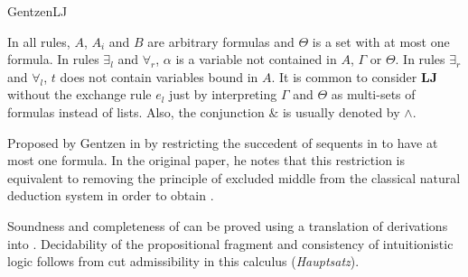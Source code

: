 \begin{entry}{GentzenLJ}
\begin{clarifications}
In all rules, $A$, $A_i$ and $B$ are arbitrary formulas and $\Theta$ is a set
with at most one formula. In rules $\exists_l$
and $\forall_r$, $\alpha$ is a variable not contained in $A$, $\Gamma$ or
$\Theta$. In rules $\exists_r$ and $\forall_l$, $t$ does not contain variables
bound in $A$.
It is common to consider \textbf{LJ} without the exchange rule $e_l$ just by
interpreting $\Gamma$ and $\Theta$ as multi-sets of formulas instead of lists.
Also, the conjunction $\&$ is usually denoted by $\wedge$.
\end{clarifications}

\begin{history}
Proposed by Gentzen in \cite{Gentzen1935} by restricting the
succedent of sequents in  to have at most one
formula. In the original paper, he notes that this restriction is equivalent to
removing the principle of excluded middle from the classical 
natural deduction system  
in order to obtain \NJ {}.
\end{history}

\begin{technicalities}
Soundness and completeness of \LJ can be proved using a translation of \LJ
derivations into \NJ {}.
Decidability of the propositional fragment and consistency of intuitionistic
logic follows from cut admissibility in this calculus (\emph{Hauptsatz}).
\end{technicalities}


\end{entry}
